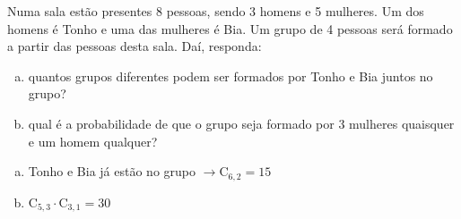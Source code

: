\begin{ex}
  Numa sala estão presentes 8 pessoas, sendo 3 homens e 5 mulheres. Um dos homens é Tonho e uma das mulheres é Bia. Um grupo de 4 pessoas será formado a partir das pessoas desta sala. Daí, responda:
    \begin{enumerate}[(a)]
    \item quantos grupos diferentes podem ser formados por Tonho e Bia juntos no grupo?
    \item qual é a probabilidade de que o grupo seja formado por 3 mulheres quaisquer e um homem qualquer?
    \end{enumerate}
     \begin{sol}
      \phantom{A}
        \begin{enumerate} [(a)]
            \item Tonho e Bia já estão no grupo $\longrightarrow \mathrm{C}_{6,2}=15$
            \item $\mathrm{C}_{5,3}\cdot\mathrm{C}_{3,1}=30$
        \end{enumerate}
     \end{sol}
\end{ex}